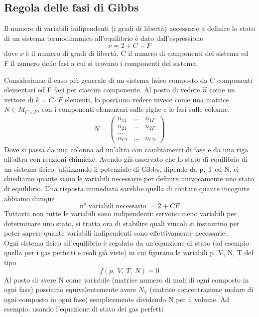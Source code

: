 \documentclass[
10pt, %
a4paper, %
oneside, %
headinclude,footinclude, %
BCOR5mm, %
]{scrartcl}
\begin{document}
\subsection{Regola delle fasi di Gibbs}
\begin{theorem}
	Il numero di variabili indipendenti (i gradi di libertà) necessarie a definire lo stato di un sistema termodinamico all'equilibrio è dato dall'espressione
	\[\nu = 2+C-F\]
	dove $\nu$ è il numero di gradi di libertà, C il numero di componenti del sistema ed F il numero delle fasi a cui si trovano i componenti del sistema.
\end{theorem}
Consideriamo il caso più generale di un sistema fisico composto da C componenti elementari ed F fasi per ciascun componente. Al posto di vedere $\vec{n}$ come un vettore di \(k =C\cdot F\) elementi, lo possiamo vedere invece come una matrice \(N\in M_{C\times F}\), con i componenti elementari sulle righe e le fasi sulle colonne.    
\begin{align*}
	N = \begin{pmatrix}
		n_{11}&...&n_{1F}\\
		n_{21}&...&n_{2F}\\
		...&&\\
		n_{C1}&...&n_{CF}
	\end{pmatrix}
\end{align*}
Dove si passa da una colonna ad un'altra con cambiamenti di fase e da una riga all'altra con reazioni chimiche. Avendo già osservato che lo stato di equilibrio di un sistema fisico, utilizzando il potenziale di Gibbs, dipende da p, T ed N, ci chiediamo quante siano le variabili necessarie per definire univocamente uno stato di equilibrio. Una risposta immediata sarebbe quella di contare quante incognite abbiamo dunque 
\[\text{n° variabili necessario }= 2 + CF\]
Tuttavia non tutte le variabili sono indipendenti: servono meno variabili per determinare uno stato, si tratta ora di stabilire quali vincoli si instaurino per poter sapere quante variabili indipendenti sono effettivamente necessarie.\\
Ogni sistema fisico all'equilibrio è regolato da un'equazione di stato (ad esempio quella per i gas perfetti e reali già viste) in cui figurano le variabili p, V, N, T del tipo
\[f(p,\ V,\ T,\ N) = 0\]
 Al posto di avere N come variabile (matrice numero di moli di ogni composto in ogni fase) possiamo equivalentemente avere \(N_V\) (matrice concentrazione molare di ogni composto in ogni fase) semplicemente dividendo N per il volume. Ad esempio, usando l'equazione di stato dei gas perfetti
\end{document}
